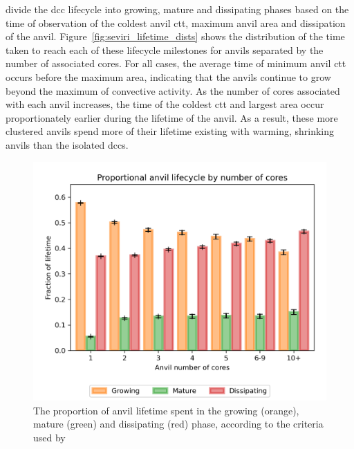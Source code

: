 \citet{futyan_deep_2007} divide the \acrshort{dcc} lifecycle into growing, mature and dissipating phases based on the time of observation of the coldest anvil \acrshort{ctt}, maximum anvil area and dissipation of the anvil. 
Figure~\ref{fig:seviri_lifetime_dists} shows the distribution of the time taken to reach each of these lifecycle milestones for anvils separated by the number of associated cores. 
For all cases, the average time of minimum anvil \acrshort{ctt} occurs before the maximum area, indicating that the anvils continue to grow beyond the maximum of convective activity. 
As the number of cores associated with each anvil increases, the time of the coldest \acrshort{ctt} and largest area occur proportionately earlier during the lifetime of the anvil. 
As a result, these more clustered anvils spend more of their lifetime existing with warming, shrinking anvils than the isolated \acrshort{dcc}s.


\begin{figure}[tp]
    \includegraphics[width=\textwidth]{figures/chapter4_12.png}
    \caption[
    The proportion of anvil lifetime spent in the growing, mature and dissipating phase
    ]{
    The proportion of anvil lifetime spent in the growing (orange), mature (green) and dissipating (red) phase, according to the criteria used by \citet{futyan_deep_2007}
    }
    \label{fig:seviri_lifetime_proportions}
\end{figure}



